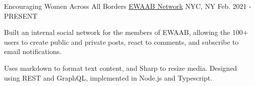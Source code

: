 \begin{cventries}
  \cventry
  {Encouraging Women Across All Borders} %
  {\href{https://ewaab.org}{EWAAB Network}} %
  {NYC, NY} %
  {Feb. 2021 - PRESENT} %
  {
    \begin{cvitems} %
      \item {Built an internal social network for the members of EWAAB, allowing the 100+ users to create public and private posts, react to comments, and subscribe to email notifications.}
      \item {Uses markdown to format text content, and Sharp to resize media. Designed using REST and GraphQL, implemented in Node.js and Typescript.}
    \end{cvitems}
  }

\end{cventries}
